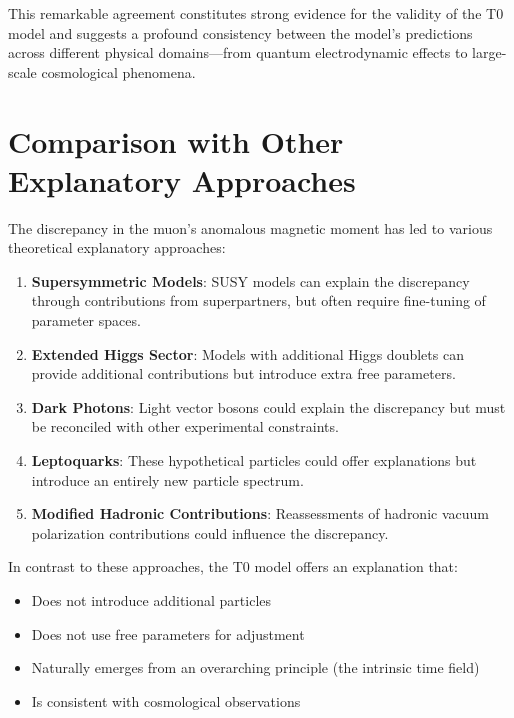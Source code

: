 \documentclass[12pt,a4paper]{article}
\begin{document}
	This remarkable agreement constitutes strong evidence for the validity of the T0 model and suggests a profound consistency between the model's predictions across different physical domains—from quantum electrodynamic effects to large-scale cosmological phenomena.
	
	\section{Comparison with Other Explanatory Approaches}
	
	The discrepancy in the muon's anomalous magnetic moment has led to various theoretical explanatory approaches:
	
	\begin{enumerate}
		\item \textbf{Supersymmetric Models}: SUSY models can explain the discrepancy through contributions from superpartners, but often require fine-tuning of parameter spaces.
		
		\item \textbf{Extended Higgs Sector}: Models with additional Higgs doublets can provide additional contributions but introduce extra free parameters.
		
		\item \textbf{Dark Photons}: Light vector bosons could explain the discrepancy but must be reconciled with other experimental constraints.
		
		\item \textbf{Leptoquarks}: These hypothetical particles could offer explanations but introduce an entirely new particle spectrum.
		
		\item \textbf{Modified Hadronic Contributions}: Reassessments of hadronic vacuum polarization contributions could influence the discrepancy.
	\end{enumerate}
	
	In contrast to these approaches, the T0 model offers an explanation that:
	
	\begin{itemize}
		\item Does not introduce additional particles
		\item Does not use free parameters for adjustment
		\item Naturally emerges from an overarching principle (the intrinsic time field)
		\item Is consistent with cosmological observations
	\end{itemize}
	
\end{document}
